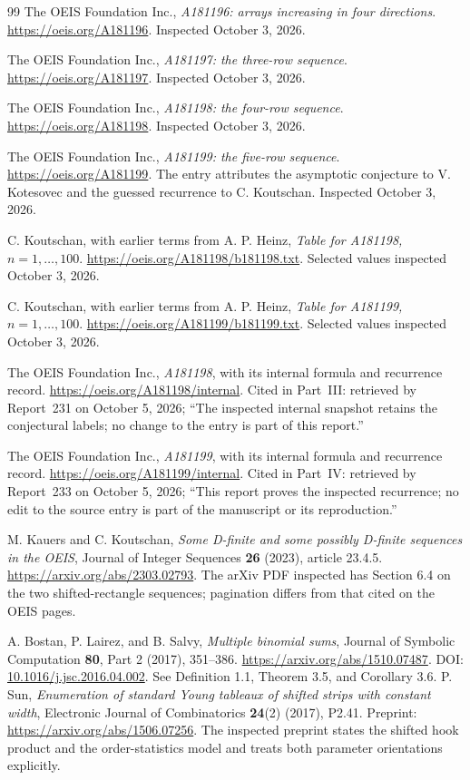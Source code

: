 \documentclass[11pt,letterpaper]{article}
\numberwithin{equation}{section}
\theoremstyle{definition}
\newcommand{\1}{\mathbf 1}
\begin{document}
\begin{thebibliography}{99}
 The OEIS Foundation Inc.,
\emph{A181196: arrays increasing in four directions}.
\url{https://oeis.org/A181196}. Inspected October 3, 2026.

 The OEIS Foundation Inc.,
\emph{A181197: the three-row sequence}.
\url{https://oeis.org/A181197}. Inspected October 3, 2026.

 The OEIS Foundation Inc.,
\emph{A181198: the four-row sequence}.
\url{https://oeis.org/A181198}. Inspected October 3, 2026.

 The OEIS Foundation Inc.,
\emph{A181199: the five-row sequence}.
\url{https://oeis.org/A181199}. The entry attributes the asymptotic conjecture
to V. Kotesovec and the guessed recurrence to C. Koutschan.
Inspected October 3, 2026.

 C. Koutschan, with earlier terms from A. P. Heinz,
\emph{Table for A181198, $n=1,\ldots,100$}.
\url{https://oeis.org/A181198/b181198.txt}. Selected values inspected
October 3, 2026.

 C. Koutschan, with earlier terms from A. P. Heinz,
\emph{Table for A181199, $n=1,\ldots,100$}.
\url{https://oeis.org/A181199/b181199.txt}. Selected values inspected
October 3, 2026.

 The OEIS Foundation Inc.,
\emph{A181198}, with its internal formula and recurrence record.
\url{https://oeis.org/A181198/internal}. Cited in Part~III: retrieved by
Report~231 on October 5, 2026; ``The inspected internal snapshot retains
the conjectural labels; no change to the entry is part of this report.''

 The OEIS Foundation Inc.,
\emph{A181199}, with its internal formula and recurrence record.
\url{https://oeis.org/A181199/internal}. Cited in Part~IV: retrieved by
Report~233 on October 5, 2026; ``This report proves the inspected
recurrence; no edit to the source entry is part of the manuscript or its
reproduction.''

 M. Kauers and C. Koutschan,
\emph{Some D-finite and some possibly D-finite sequences in the OEIS},
Journal of Integer Sequences \textbf{26} (2023), article 23.4.5.
\url{https://arxiv.org/abs/2303.02793}.
The arXiv PDF inspected has Section 6.4 on the two shifted-rectangle
sequences; pagination differs from that cited on the OEIS pages.

A. Bostan, P. Lairez, and B. Salvy,
\emph{Multiple binomial sums},
Journal of Symbolic Computation \textbf{80}, Part 2 (2017), 351--386.
\url{https://arxiv.org/abs/1510.07487}.
DOI: \href{https://doi.org/10.1016/j.jsc.2016.04.002}{10.1016/j.jsc.2016.04.002}.
See Definition 1.1, Theorem 3.5, and Corollary 3.6.
 P. Sun,
\emph{Enumeration of standard Young tableaux of shifted strips with
constant width}, Electronic Journal of Combinatorics \textbf{24}(2)
(2017), P2.41. Preprint: \url{https://arxiv.org/abs/1506.07256}.
The inspected preprint states the shifted hook product and the
order-statistics model and treats both parameter orientations explicitly.


\end{thebibliography}
\end{document}
